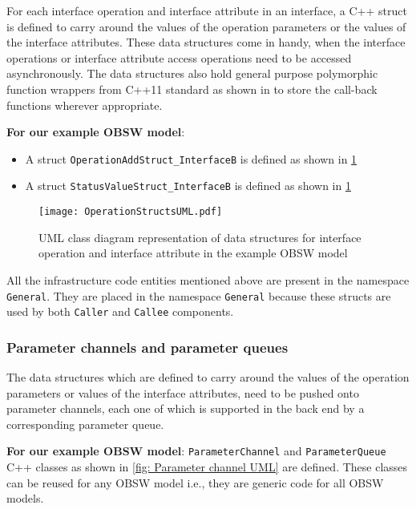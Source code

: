For each interface operation and interface attribute in an interface, a C++ struct is defined to carry around the values of the operation parameters or the values of the interface attributes. These data structures come in handy, when the interface operations or interface attribute access operations need to be accessed asynchronously. The data structures also hold general purpose polymorphic function wrappers from C++11 standard as shown in \cite{C++11CallBack} to store the call-back functions wherever appropriate. 

\textbf{For our example OBSW model}:
\begin{itemize}
\item A struct \texttt{OperationAdd\allowbreak Struct\_\allowbreak InterfaceB} is defined as shown in \cref{fig: Operation structs UML}
\item A struct \texttt{StatusValue\allowbreak Struct\_\allowbreak InterfaceB} is defined as shown in \cref{fig: Operation structs UML}
\end{itemize} 

\begin{figure}[h]
	\centering
	\texttt{[image: OperationStructsUML.pdf]}
	\caption{UML class diagram representation of data structures for interface operation and interface attribute in the example OBSW model}
	\label{fig: Operation structs UML}
\end{figure} 

All the infrastructure code entities mentioned above are present in the namespace \texttt{General}. They are placed in the namespace \texttt{General} because these structs are used by both \texttt{Caller} and \texttt{Callee} components.

\subsubsection{\textbf{Parameter channels and parameter queues}}
The data structures which are defined to carry around the values of the operation parameters or values of the interface attributes, need to be pushed onto parameter channels, each one of which is supported in the back end by a corresponding parameter queue.

\textbf{For our example OBSW model}: \texttt{Parameter\allowbreak Channel} and \texttt{Parameter\allowbreak Queue} C++ classes as shown in \cref{fig: Parameter channel UML} are defined. These classes can be reused for any OBSW model i.e., they are generic code for all OBSW models. 

